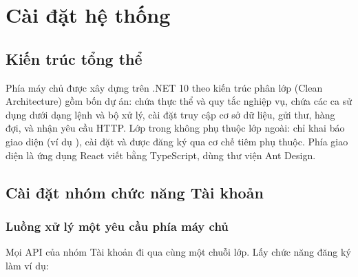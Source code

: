 \chapter{Cài đặt hệ thống}

\section{Kiến trúc tổng thể}

Phía máy chủ được xây dựng trên .NET 10 theo kiến trúc phân lớp (Clean Architecture) gồm bốn dự án:
 chứa thực thể và quy tắc nghiệp vụ,  chứa các ca sử dụng dưới dạng
lệnh và bộ xử lý,  cài đặt truy cập cơ sở dữ liệu, gửi thư, hàng đợi, và
 nhận yêu cầu HTTP. Lớp trong không phụ thuộc lớp ngoài:  chỉ khai báo
giao diện (ví dụ ),  cài đặt và được đăng ký qua cơ chế tiêm
phụ thuộc. Phía giao diện là ứng dụng React viết bằng TypeScript, dùng thư viện Ant Design.


\section{Cài đặt nhóm chức năng Tài khoản}
\label{sec:cai-dat-tai-khoan}

\subsection{Luồng xử lý một yêu cầu phía máy chủ}

Mọi API của nhóm Tài khoản đi qua cùng một chuỗi lớp. Lấy chức năng đăng ký làm ví dụ:

